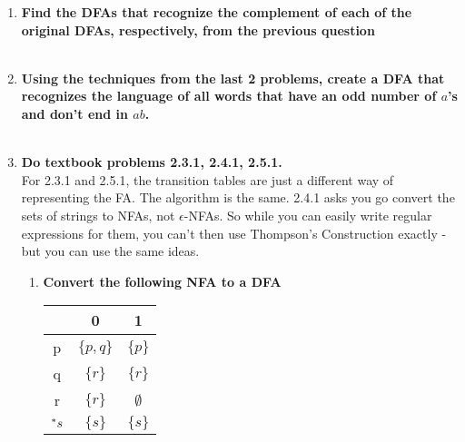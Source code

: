 \begin{enumerate}
\begin{enumerate}

\item 

\end{enumerate}

\newpage
\item \textbf{Find the DFAs that recognize the complement of each of the original DFAs, respectively, from the previous question}
\\\\

\newpage
\item \textbf{Using the techniques from the last 2 problems, create a DFA that recognizes the language of all words that have an odd number of $a$'s and don't end in $ab$.}
\\\\

\newpage
\item \textbf{Do textbook problems 2.3.1, 2.4.1, 2.5.1.}
\\ For 2.3.1 and 2.5.1, the transition tables are just a different way of representing the FA. The algorithm is the same.
2.4.1 asks you go convert the sets of strings to NFAs, not $\epsilon$-NFAs. So while you can easily write regular expressions for them, you can't then use Thompson's Construction exactly -  but you can use the same ideas.
\begin{enumerate}
	\item \textbf{Convert the following NFA to a DFA}
	\begin{table}[]
		\begin{tabular}{c||c|c}
			 &  0 &  1   \\ \hline
			p& $\{p,q\}$ &  $\{p\}$   \\ \hline
			q&  $\{r\}$& $\{r\}$   \\ \hline
			r&  $\{r\}$& $\emptyset$   \\ \hline
			${}^\ast s$& $\{s\}$ & $\{s\}$ \\ \hline
		\end{tabular}
	\end{table}


\end{enumerate}
\end{enumerate}
